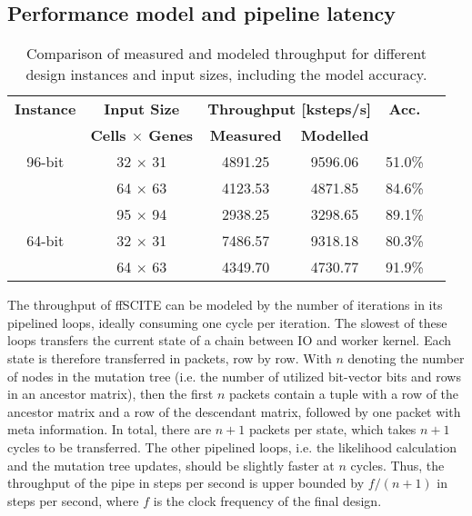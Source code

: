 \subsection{Performance model and pipeline latency}

\begin{table}[tbh]
    \begin{tabular}{cccccc}
        \toprule
        \textbf{Instance} & \textbf{Input Size} & \multicolumn{2}{c}{\textbf{Throughput [ksteps/s]}} & \textbf{Acc.} \\
        \cmidrule(r){1-1} \cmidrule(r){2-2} \cmidrule(r){3-4} \cmidrule(r){5-5}
        & \textbf{Cells $\times$ Genes} & \textbf{Measured} & \textbf{Modelled} \\
        96-bit & 32 $\times$ 31 & 4891.25 & 9596.06 & 51.0\% \\
        & 64 $\times$ 63 & 4123.53 & 4871.85 & 84.6\% \\
        & 95 $\times$ 94  & 2938.25 & 3298.65 & 89.1\% \\
        64-bit & 32 $\times$ 31 & 7486.57 & 9318.18 & 80.3\% \\
        & 64 $\times$ 63 & 4349.70 & 4730.77 & 91.9\% \\
        \bottomrule
    \end{tabular}
    \caption{Comparison of measured and modeled throughput for different design instances and input sizes, including the model accuracy.}
    \label{tab:model}
\end{table}

The throughput of \ac{ffSCITE} can be modeled by the number of iterations in its pipelined loops, ideally consuming one cycle per iteration. The slowest of these loops transfers the current state of a chain between IO and worker kernel.
Each state is therefore transferred in packets, row by row. With $n$ denoting the number of nodes in the mutation tree (i.e. the number of utilized bit-vector bits and rows in an ancestor matrix), then the first $n$ packets contain a tuple with a row of the ancestor matrix and a row of the descendant matrix, followed by one packet with meta information. In total, there are $n+1$ packets per state, which takes $n+1$ cycles to be transferred. The other pipelined loops, i.e. the likelihood calculation and the mutation tree updates, should be slightly faster at $n$ cycles.
Thus, the throughput of the pipe in steps per second is upper bounded by $f/(n+1)$ in steps per second, where $f$ is the clock frequency of the final design.

